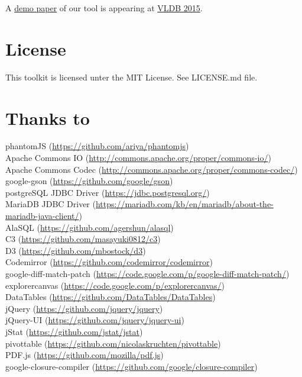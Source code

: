 \documentclass[11pt]{article}
\begin{document}
\noindent A \href{https://infosys.uni-saarland.de/publications/p1972-dittrich.pdf}{demo paper} of our tool is appearing at \href{http://www.vldb.org/2015/}{VLDB 2015}. 

\section{License}
\noindent This toolkit is licensed unter the MIT License. See LICENSE.md file.\\

\newpage
\tableofcontents
\newpage

\section{Thanks to}
phantomJS (\url{https://github.com/ariya/phantomjs})\\
Apache Commons IO (\url{http://commons.apache.org/proper/commons-io/})\\
Apache Commons Codec (\url{http://commons.apache.org/proper/commons-codec/})\\
google-gson (\url{https://github.com/google/gson})\\
postgreSQL JDBC Driver (\url{https://jdbc.postgresql.org/})\\
MariaDB JDBC Driver (\url{https://mariadb.com/kb/en/mariadb/about-the-mariadb-java-client/})\\
AlaSQL (\url{https://github.com/agershun/alasql})\\
C3 (\url{https://github.com/masayuki0812/c3})\\
D3 (\url{https://github.com/mbostock/d3})\\
Codemirror (\url{https://github.com/codemirror/codemirror})\\
google-diff-match-patch (\url{https://code.google.com/p/google-diff-match-patch/})\\
explorercanvas (\url{https://code.google.com/p/explorercanvas/})\\
DataTables (\url{https://github.com/DataTables/DataTables})\\
jQuery (\url{https://github.com/jquery/jquery})\\
jQuery-UI (\url{https://github.com/jquery/jquery-ui})\\
jStat (\url{https://github.com/jstat/jstat})\\
pivottable (\url{https://github.com/nicolaskruchten/pivottable})\\
PDF.js (\url{https://github.com/mozilla/pdf.js})\\
google-closure-compiler (\url{https://github.com/google/closure-compiler})\\
\end{document}
